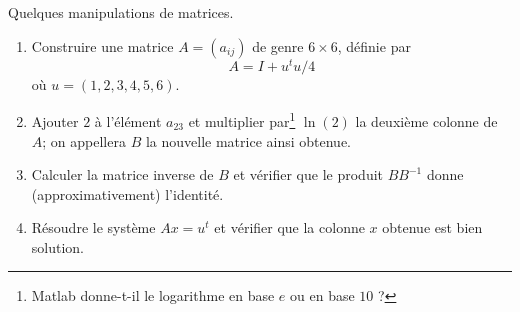 \begin{exercice}\label{exoSC_serie1-0003}

	Quelques manipulations de matrices.

	\begin{enumerate}

		\item			
			Construire une matrice $A=(a_{ij})$ de genre $6\times 6$, définie par
			\begin{equation}
				A=I+u^tu/4
			\end{equation}
			où $u=(1,2,3,4,5,6)$.
		\item
			Ajouter $2$ à l'élément $a_{23}$ et multiplier par\footnote{Matlab donne-t-il le logarithme en base $e$ ou en base $10$ ?} $\ln(2)$ la deuxième colonne de $A$; on appellera $B$ la nouvelle matrice ainsi obtenue.
		\item
			Calculer la matrice inverse de $B$ et vérifier que le produit $BB^{-1}$ donne (approximativement) l'identité.
		\item
			Résoudre le système $Ax=u^t$ et vérifier que la colonne $x$ obtenue est bien solution.
	\end{enumerate}
	

\end{exercice}
